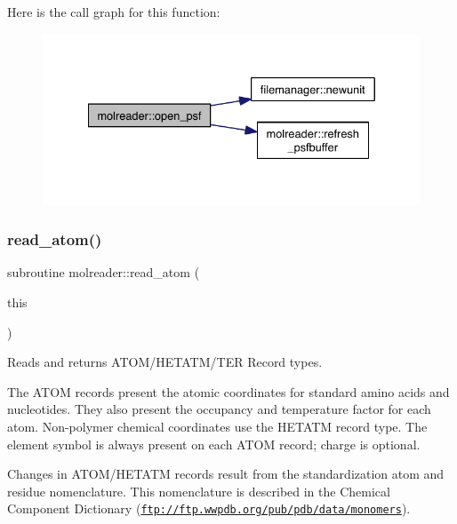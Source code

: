 Here is the call graph for this function\+:\nopagebreak
\begin{figure}[H]
\begin{center}
\leavevmode
\includegraphics[width=332pt]{namespacemolreader_a3ebd81391f00e3279bf262b2879af97a_cgraph}
\end{center}
\end{figure}
\mbox{\label{namespacemolreader_a49ccaf345b633e27f69ad7a5a8637a2a}} 
\subsubsection{\texorpdfstring{read\+\_\+atom()}{read\_atom()}}
{\footnotesize\ttfamily subroutine molreader\+::read\+\_\+atom (\begin{DoxyParamCaption}\item[{type(\hyperlink{structmolreader_1_1atom}{atom}), intent(inout)}]{this }\end{DoxyParamCaption})\hspace{0.3cm}{\ttfamily [private]}}



Reads and returns A\+T\+O\+M/\+H\+E\+T\+A\+T\+M/\+T\+ER Record types. 

The A\+T\+OM records present the atomic coordinates for standard amino acids and nucleotides. They also present the occupancy and temperature factor for each atom. Non-\/polymer chemical coordinates use the H\+E\+T\+A\+TM record type. The element symbol is always present on each A\+T\+OM record; charge is optional.

Changes in A\+T\+O\+M/\+H\+E\+T\+A\+TM records result from the standardization atom and residue nomenclature. This nomenclature is described in the Chemical Component Dictionary (\href{ftp://ftp.wwpdb.org/pub/pdb/data/monomers}{\tt ftp\+://ftp.\+wwpdb.\+org/pub/pdb/data/monomers}).

